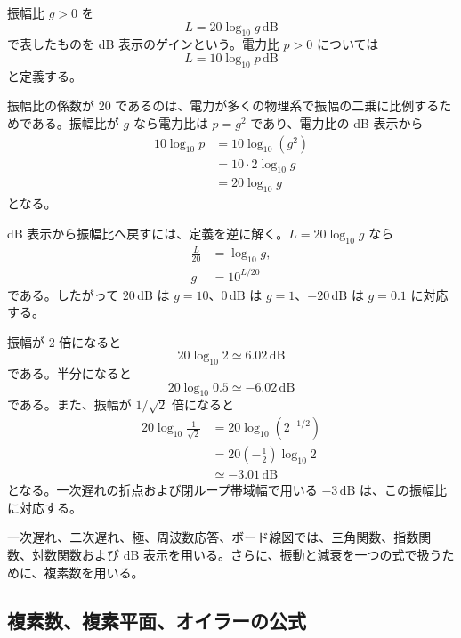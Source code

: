 \begin{definition}[デシベル]
振幅比 $g>0$ を
\begin{equation}
  L=20\log_{10}g\,\mathrm{dB}
\end{equation}
で表したものを dB 表示のゲインという。電力比 $p>0$ については
\begin{equation}
  L=10\log_{10}p\,\mathrm{dB}
\end{equation}
と定義する。
\end{definition}

振幅比の係数が 20 であるのは、電力が多くの物理系で振幅の二乗に比例するためである。振幅比が $g$ なら電力比は $p=g^2$ であり、電力比の dB 表示から
\begin{align}
  10\log_{10}p
  &=10\log_{10}(g^2)\\
  &=10\cdot2\log_{10}g\\
  &=20\log_{10}g
\end{align}
となる。

dB 表示から振幅比へ戻すには、定義を逆に解く。$L=20\log_{10}g$ なら
\begin{align}
  \frac{L}{20}&=\log_{10}g,\\
  g&=10^{L/20}
\end{align}
である。したがって $20\,\mathrm{dB}$ は $g=10$、$0\,\mathrm{dB}$ は $g=1$、$-20\,\mathrm{dB}$ は $g=0.1$ に対応する。

\begin{example}[ゲイン比の dB 表示]
振幅が 2 倍になると
\begin{equation}
  20\log_{10}2\simeq6.02\,\mathrm{dB}
\end{equation}
である。半分になると
\begin{equation}
  20\log_{10}0.5\simeq-6.02\,\mathrm{dB}
\end{equation}
である。また、振幅が $1/\sqrt{2}$ 倍になると
\begin{align}
  20\log_{10}\frac{1}{\sqrt{2}}
  &=20\log_{10}(2^{-1/2})\\
  &=20\left(-\frac{1}{2}\right)\log_{10}2\\
  &\simeq -3.01\,\mathrm{dB}
\end{align}
となる。一次遅れの折点および閉ループ帯域幅で用いる $-3\,\mathrm{dB}$ は、この振幅比に対応する。
\end{example}

一次遅れ、二次遅れ、極、周波数応答、ボード線図では、三角関数、指数関数、対数関数および dB 表示を用いる。さらに、振動と減衰を一つの式で扱うために、複素数を用いる。

\subsection{複素数、複素平面、オイラーの公式}

